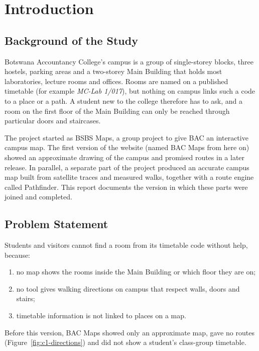 \documentclass[12pt,a4paper]{report}
\begin{document}
\clearpage
{}

\chapter{Introduction}

\section{Background of the Study}
Botswana Accountancy College's campus is a group of single-storey blocks, three hostels, parking areas and a two-storey Main Building that holds most laboratories, lecture rooms and offices. Rooms are named on a published timetable (for example \emph{MC-Lab 1/017}), but nothing on campus links such a code to a place or a path. A student new to the college therefore has to ask, and a room on the first floor of the Main Building can only be reached through particular doors and staircases.

The project started as BSBS Maps, a group project to give BAC an interactive campus map. The first version of the website (named BAC Maps from here on) showed an approximate drawing of the campus and promised routes in a later release. In parallel, a separate part of the project produced an accurate campus map built from satellite traces and measured walks, together with a route engine called Pathfinder. This report documents the version in which these parts were joined and completed.

\section{Problem Statement}
Students and visitors cannot find a room from its timetable code without help, because:
\begin{enumerate}
  \item no map shows the rooms inside the Main Building or which floor they are on;
  \item no tool gives walking directions on campus that respect walls, doors and stairs;
  \item timetable information is not linked to places on a map.
\end{enumerate}
Before this version, BAC Maps showed only an approximate map, gave no routes (Figure~\ref{fig:c1-directions}) and did not show a student's class-group timetable.
\end{document}
